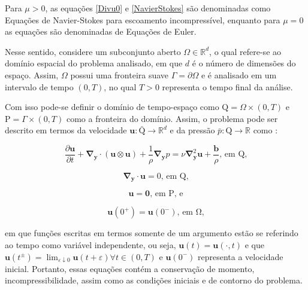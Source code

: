 \documentclass[_ArquivoPrincipal.tex]{subfiles}
\begin{document}
Para $\mu>0$, as equações \ref{Divu0} e \ref{NavierStokes} são denominadas como Equações de Navier-Stokes para escoamento incompressível, enquanto para $\mu=0$ as equações são denominadas de Equações de Euler.

Nesse sentido, considere um subconjunto aberto $\Omega\in\mathbb{R}^d$, o qual refere-se ao domínio espacial do problema analisado, em que $d$ é o número de dimensões do espaço. Assim, $\Omega$ possui uma fronteira suave $\Gamma=\partial\Omega$ e é analisado em um intervalo de tempo $(0,T)$, no qual $T>0$ representa o tempo final da análise.

Com isso pode-se definir o domínio de tempo-espaço como $\mathrm{Q}=\Omega\times(0,T)$ e $\mathrm{P}=\Gamma\times(0,T)$ como a fronteira do domínio. Assim, o problema pode ser descrito em termos da velocidade $\mathbf{u}:\bar{\mathrm{Q}}\to\mathbb{R}^d$ e da pressão $\bar{p}:\mathrm{Q}\to\mathbb{R}$ como \cite{hughes2000large}:

\begin{equation}
    \frac{\partial\mathbf{u}}{\partial t}+\mathbf{\nabla}_\mathbf{y}\cdot(\mathbf{u}\otimes\mathbf{u})+\frac{1}{\rho}\mathbf{\nabla}_\mathbf{y}p=\nu\mathbf{\nabla}^2_\mathbf{y}\mathbf{u}+\frac{\mathbf{b}}{\rho}\text{, em }\mathrm{Q}\text{,}
    \label{Sist1}
\end{equation}

\begin{equation}
    \mathbf{\nabla}_\mathbf{y}\cdot\mathbf{u}=0\text{, em }\mathrm{Q}\text{,}
    \label{Sist2}
\end{equation}

\begin{equation}
    \mathbf{u}=\mathbf{0}\text{, em }\mathrm{P}\text{, e}
    \label{Sist3}
\end{equation}

\begin{equation}
    \mathbf{u}(0^+)=\mathbf{u}(0^-)\text{, em }\mathrm{\Omega}\text{,}
    \label{Sist4}
\end{equation}

\noindent em que funções escritas em termos somente de um argumento estão se referindo ao tempo como variável independente, ou seja, $\mathbf{u}(t)=\mathbf{u}(\cdot,t)$ e que $\mathbf{u}(t^\pm)=\lim_{\varepsilon\downarrow0}{\mathbf{u}(t+\varepsilon)\forall t\in(0,T)}$ e $\mathbf{u}(0^-)$ representa a velocidade inicial. Portanto, essas equações contém a conservação de momento, incompressibilidade, assim como as condições iniciais e de contorno do problema.
\end{document}
